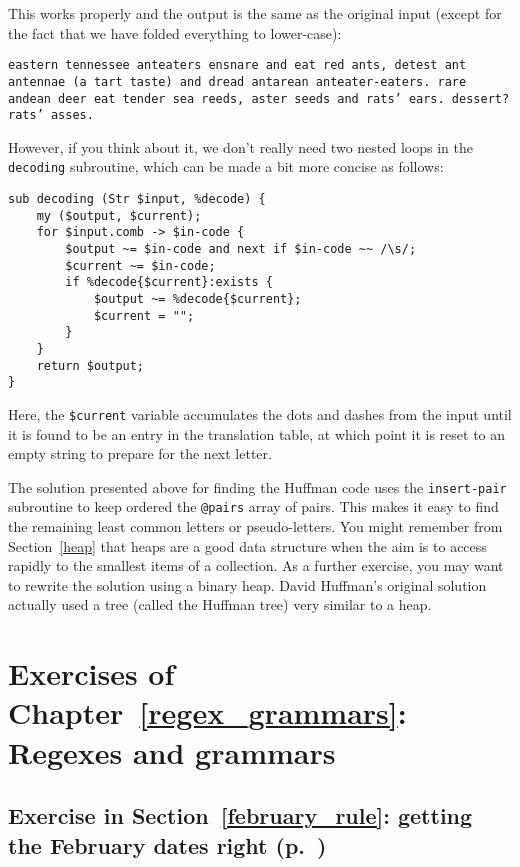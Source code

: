 This works properly and the output is the same as the original 
input (except for the fact that we have folded everything to 
lower-case):

\begin{verbatim}
eastern tennessee anteaters ensnare and eat red ants, detest ant
antennae (a tart taste) and dread antarean anteater-eaters. rare
andean deer eat tender sea reeds, aster seeds and rats’ ears. dessert?
rats’ asses.
\end{verbatim}

However, if you think about it, we don't really need two 
nested loops in the {\tt decoding} subroutine, which can be 
made a bit more concise as follows:

\begin{verbatim}
sub decoding (Str $input, %decode) {
    my ($output, $current);
    for $input.comb -> $in-code {
        $output ~= $in-code and next if $in-code ~~ /\s/;
        $current ~= $in-code;
        if %decode{$current}:exists {
            $output ~= %decode{$current};
            $current = "";
        }
    }
    return $output;
}
\end{verbatim}

Here, the \verb'$current' variable accumulates the dots and 
dashes from the input until it is found to be an entry in 
the translation table, at which point it is reset to an 
empty string to prepare for the next letter.

The solution presented above for finding the Huffman code 
uses the {\tt insert-pair} subroutine to keep ordered the 
\verb'@pairs' array of pairs. This makes it easy to find the remaining 
least common letters or pseudo-letters. You might remember 
from Section~\ref{heap} that heaps are a good data structure 
when the aim is to access rapidly to the smallest items 
of a collection. As a further exercise, you may want to 
rewrite the solution using a binary heap. David Huffman's original 
solution actually used a tree (called the Huffman tree) very 
similar to a heap.


\section{Exercises of Chapter~\ref{regex_grammars}: Regexes and grammars}

\subsection{Exercise in Section~\ref{february_rule}: getting the February dates right (p.~\pageref{february_rule})}
\label{sol_february_rule}

